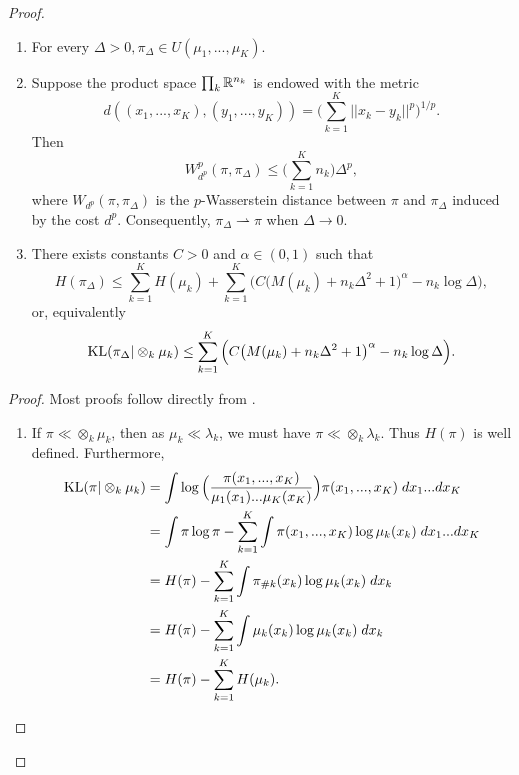 \begin{proof}
\begin{lemma}
\begin{enumerate}
        \item For every $\Delta > 0, \pi_{\Delta} \in U(\mu_1, ..., \mu_K)$.

        \item Suppose the product space $\prod_k \mathbb R^{n_k}$ is endowed with the metric
        \begin{equation}
          d((x_1, ..., x_K), (y_1, ..., y_K)) = \Big( \sum_{k=1}^K \vert\vert x_k - y_k \vert\vert^p \Big)^{1/p}.
        \end{equation}
        Then
        \begin{equation}
          W^p_{d^p}(\pi, \pi_{\Delta}) \leq \Big( \sum_{k=1}^K n_k \Big) \Delta^p,
        \end{equation}
        where $W_{d^p}(\pi, \pi_{\Delta})$ is the $p$-Wasserstein distance between $\pi$ and $\pi_{\Delta}$ induced by the cost $d^p$.
        Consequently, $\pi_{\Delta} \rightharpoonup \pi$ when $\Delta \to 0$.

        \item There exists constants $C > 0$ and $\alpha \in (0,1)$ such that
        \begin{equation}
          H(\pi_{\Delta}) \leq \sum_{k=1}^K H(\mu_k) +
          \sum_{k=1}^K \Big( C \big( M(\mu_k) + n_k \Delta^2 + 1 \big)^{\alpha} - n_k \log \Delta \Big),
        \end{equation}
        or, equivalently
        \begin{equation}
          \text{KL}(\pi_{\Delta} \vert \otimes_k \mu_k) \leq
          \sum_{k=1}^K \Big( C \big( M(\mu_k) + n_k \Delta^2 + 1 \big)^{\alpha} - n_k \log \Delta \Big).
        \end{equation}
      \end{enumerate}
    \end{lemma}
    \begin{proof}
      Most proofs follow directly from \citep{Carlier17}.
      \begin{enumerate}
        \item If $\pi \ll \otimes_k \mu_k$, then as $\mu_k \ll \lambda_k$, we must have $\pi \ll \otimes_k \lambda_k$. Thus $H(\pi)$ is well
        defined. Furthermore,
        \begin{equation}
          \begin{split}
            \text{KL}(\pi \vert \otimes_k \mu_k)
            &= \int \log \Big( \frac{\pi(x_1,...,x_K)}{\mu_1(x_1)...\mu_K(x_K)} \Big) \pi(x_1, ..., x_K) \; dx_1 ... dx_K \\
            &= \int \pi \log \pi - \sum_{k=1}^K \int \pi(x_1, ..., x_K) \log \mu_k(x_k) \; dx_1 ... dx_K \\
            &= H(\pi) - \sum_{k=1}^K \int \pi_{\# k}(x_k) \log \mu_k(x_k) \; dx_k \\
            &= H(\pi) - \sum_{k=1}^K \int \mu_k(x_k) \log \mu_k(x_k) \; dx_k \\
            &= H(\pi) - \sum_{k=1}^K H(\mu_k).
          \end{split}
        \end{equation}


\end{enumerate}
\end{proof}
\end{proof}
